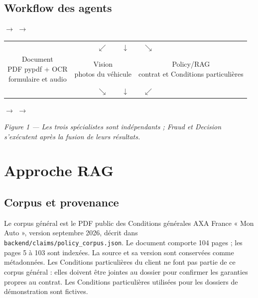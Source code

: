 \documentclass[10pt,a4paper]{article}
\newcommand{\code}[1]{\texttt{\small #1}}
\begin{document}
\subsection*{Workflow des agents}
\begin{center}
\setlength{\tabcolsep}{4pt}
\renewcommand{\arraystretch}{1.25}
\(\longrightarrow\)
\(\longrightarrow\)

\vspace{2mm}
\begin{tabular}{ccc}
\multicolumn{3}{c}{\(\swarrow\qquad\downarrow\qquad\searrow\)}\\[-1mm]
\fbox{\parbox{3.3cm}{\centering Document\\PDF pypdf + OCR\\formulaire et audio}} &
\fbox{\parbox{3.0cm}{\centering Vision\\photos du véhicule}} &
\fbox{\parbox{3.3cm}{\centering Policy/RAG\\contrat et Conditions particulières}}\\
\multicolumn{3}{c}{\(\searrow\qquad\downarrow\qquad\swarrow\)}
\end{tabular}

\vspace{1mm}
\(\longrightarrow\)
\(\longrightarrow\)
\end{center}
{\small\emph{Figure 1 — Les trois spécialistes sont indépendants ; Fraud et Decision s’exécutent après la fusion de leurs résultats.}}

\newpage
\section{Approche RAG}
\subsection*{Corpus et provenance}
Le corpus général est le PDF public des Conditions générales AXA France « Mon Auto », version septembre 2026, décrit dans \code{backend/claims/policy\_corpus.json}. Le document comporte 104 pages ; les pages 5 à 103 sont indexées. La source et sa version sont conservées comme métadonnées. Les Conditions particulières du client ne font pas partie de ce corpus général : elles doivent être jointes au dossier pour confirmer les garanties propres au contrat. Les Conditions particulières utilisées pour les dossiers de démonstration sont fictives.
\end{document}
